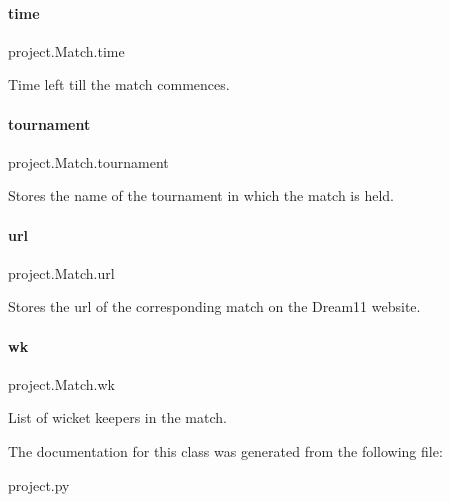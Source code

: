 \paragraph{\texorpdfstring{time}{time}}
{\footnotesize\ttfamily project.\+Match.\+time}



Time left till the match commences. 

\mbox{\label{classproject_1_1Match_ac377f100bd078655a754762297731e8a}} 
\paragraph{\texorpdfstring{tournament}{tournament}}
{\footnotesize\ttfamily project.\+Match.\+tournament}



Stores the name of the tournament in which the match is held. 

\mbox{\label{classproject_1_1Match_aeac700e0377708bc3d768f572544ab5e}} 
\paragraph{\texorpdfstring{url}{url}}
{\footnotesize\ttfamily project.\+Match.\+url}



Stores the url of the corresponding match on the Dream11 website. 

\mbox{\label{classproject_1_1Match_aaed99cf294a0dc51d89caccf11307842}} 
\paragraph{\texorpdfstring{wk}{wk}}
{\footnotesize\ttfamily project.\+Match.\+wk}



List of wicket keepers in the match. 



The documentation for this class was generated from the following file\+:\begin{DoxyCompactItemize}
\item 
project.\+py\end{DoxyCompactItemize}
